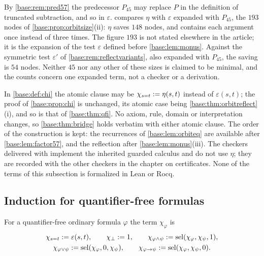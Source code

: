 \begin{remark}
\label{base:rem:orbiteq}
By \cref{base:rem:pred57} the predecessor $P_{45}$ may replace $P$ in the
definition of truncated subtraction, and so in $\varepsilon$.
 compares $\eta$ with $\varepsilon$ expanded with
$P_{45}$, the $193$ nodes of \cref{base:prop:orbitsize}(ii): $\eta$ saves
$148$ nodes, and contains each argument once instead of three times.  The
figure $193$ is not stated elsewhere in the article; it is the expansion of
the test $\varepsilon$ defined before \cref{base:lem:monus}.  Against the
symmetric test $\varepsilon'$ of \cref{base:rem:reflectvariants}, also
expanded with $P_{45}$, the saving is $54$ nodes.
Neither $45$ nor any other of these sizes is claimed to be minimal, and the
counts concern one expanded term, not a checker or a derivation.

In \cref{base:def:chi} the atomic clause may be
$\chi_{s=t}\mathrel{:=}\eta(s,t)$ instead of $\varepsilon(s,t)$; the proof of
\cref{base:prop:chi} is unchanged, its atomic case being
\cref{base:thm:orbitreflect}(i), and so is that of \cref{base:thm:qfi}.  No
axiom, rule, domain or interpretation changes, so \cref{base:thm:bridge}
holds verbatim with either atomic clause.  The order of the construction is
kept: the recurrences of \cref{base:lem:orbiteq} are available after
\cref{base:lem:factor57}, and the reflection after
\cref{base:lem:monus}(iii).  The checkers delivered with
 implement the inherited guarded calculus and do not use
$\eta$; they are recorded with the other checkers in the chapter on
certificates.  None of the terms of this subsection is formalized in Lean or
Rocq.
\end{remark}

\subsection{Induction for quantifier-free formulas}

\begin{definition}
\label{base:def:chi}
For a quantifier-free ordinary formula $\varphi$ the term $\chi_\varphi$ is
\begin{gather*}
 \chi_{s=t}\mathrel{:=}\varepsilon(s,t),\qquad \chi_\bot\mathrel{:=} 1,\qquad
 \chi_{\varphi\wedge\psi}\mathrel{:=}\operatorname{sel}(\chi_\varphi,\chi_\psi,1),\\
 \chi_{\varphi\vee\psi}\mathrel{:=}\operatorname{sel}(\chi_\varphi,0,\chi_\psi),\qquad
 \chi_{\varphi\to\psi}\mathrel{:=}\operatorname{sel}(\chi_\varphi,\chi_\psi,0).
\end{gather*}
\end{definition}

